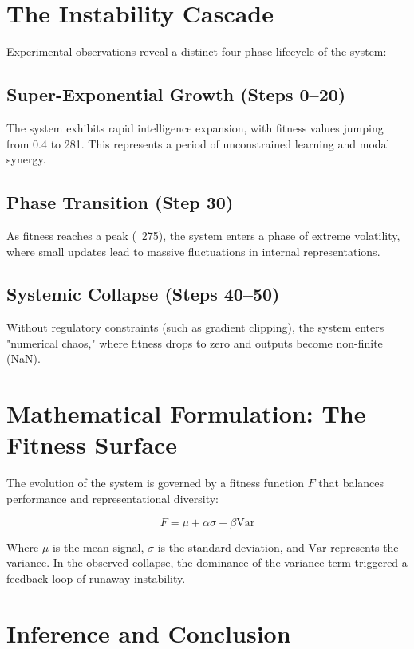 \documentclass[12pt]{article}
\begin{document}
\section{The Instability Cascade}

Experimental observations reveal a distinct four-phase lifecycle of the system:

\subsection{Super-Exponential Growth (Steps 0--20)}
The system exhibits rapid intelligence expansion, with fitness values jumping from 0.4 to 281. This represents a period of unconstrained learning and modal synergy.

\subsection{Phase Transition (Step 30)}
As fitness reaches a peak (~275), the system enters a phase of extreme volatility, where small updates lead to massive fluctuations in internal representations.

\subsection{Systemic Collapse (Steps 40--50)}
Without regulatory constraints (such as gradient clipping), the system enters "numerical chaos," where fitness drops to zero and outputs become non-finite (NaN).

\section{Mathematical Formulation: The Fitness Surface}

The evolution of the system is governed by a fitness function $F$ that balances performance and representational diversity:

\[
F = \mu + \alpha \sigma - \beta \text{Var}
\]

Where $\mu$ is the mean signal, $\sigma$ is the standard deviation, and $\text{Var}$ represents the variance. In the observed collapse, the dominance of the variance term triggered a feedback loop of runaway instability.

\section{Inference and Conclusion}
\end{document}
